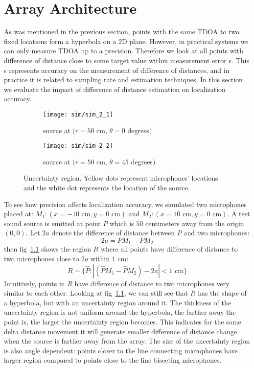 \chapter{Array Architecture}
As was mentioned in the previous section, points with the same TDOA to two fixed locations form a hyperbola on a 2D plane. However, in practical systems we can only measure TDOA up to a precision. Therefore we look at all points with difference of distance close to some target value within measurement error $\epsilon$. This $\epsilon$ represents accuracy on the measurement of difference of distances, and in practice it is related to sampling rate and estimation techniques. In this section we evaluate the impact of difference of distance estimation on localization accuracy.

\begin{figure}[]
  \centering
  \begin{subfigure}[]{.46\textwidth}
    \texttt{[image: sim/sim\_2\_1]}
    \caption{source at $(r=50$ cm, $\theta = 0$ degrees$)$}
  \end{subfigure}
  \begin{subfigure}[]{.46\textwidth}
    \texttt{[image: sim/sim\_2\_2]}
    \caption{source at $(r=50$ cm, $\theta = 45$ degrees$)$}
  \end{subfigure}
  \caption{Uncertainty region. Yellow dots represent microphones' locations and the white dot represents the location of the source.}
  \label{fig:sim_2_5}
\end{figure}

To see how precision affects localization accuracy, we simulated two microphones placed at: $M_1:(x=-10\mbox{ cm},y=0\mbox{ cm})$ and $M_2:(x=10\mbox{ cm},y=0\mbox{ cm})$. A test sound source is emitted at point $P$ which is $50$ centimeters away from the origin $(0,0)$. Let $2a$ denote the difference of distance between $P$ and two microphones:
\[
2a = P M_1 - P M_2 
\]
then fig~\ref{fig:sim_2_5} shows the region $R$ where all points have difference of distance to two microphones close to $2a$ within $1$ cm:
\[
R=\{\hat P: |(\hat P M_1 - \hat P M_2) - 2a|< 1 \mbox{ cm}\}
\]
Intuitively, points in $R$ have difference of distance to two microphones very similar to each other. Looking at fig~\ref{fig:sim_2_5}, we can still see that $R$ has the shape of a hyperbola, but with an uncertainty region around it. The thickness of the uncertainty region is not uniform around the hyperbola, the farther away the point is, the larger the uncertainty region becomes. This indicates for the same delta distance movement it will generate smaller difference of distance change when the source is farther away from the array. The size of the uncertainty region is also angle dependent: points closer to the line connecting microphones have larger region compared to points close to the line bisecting microphones. 

